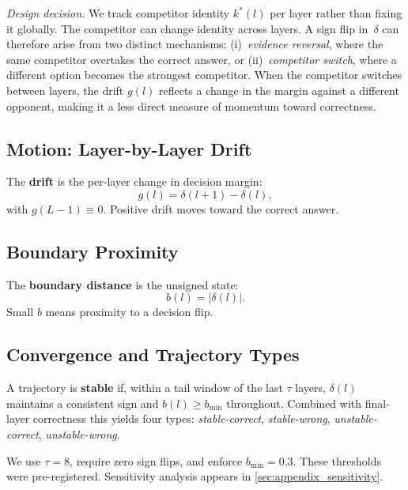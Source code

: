 \documentclass{article}
\begin{document}
\emph{Design decision.}  We track competitor identity $k^*(l)$ per layer rather than fixing it globally.  The competitor can change identity across layers.  A sign flip in~$\delta$ can therefore arise from two distinct mechanisms: (i)~\emph{evidence reversal}, where the same competitor overtakes the correct answer, or (ii)~\emph{competitor switch}, where a different option becomes the strongest competitor.  When the competitor switches between layers, the drift $g(l)$ reflects a change in the margin against a different opponent, making it a less direct measure of momentum toward correctness.

\subsection{Motion: Layer-by-Layer Drift}

The \textbf{drift} is the per-layer change in decision margin:
\begin{equation}
  g(l) = \delta(l{+}1) - \delta(l),
  \label{eq:drift}
\end{equation}
with $g(L{-}1) \equiv 0$.  Positive drift moves toward the correct answer.

\subsection{Boundary Proximity}

The \textbf{boundary distance} is the unsigned state:
\begin{equation}
  b(l) = |\delta(l)|.
  \label{eq:boundary}
\end{equation}
Small $b$ means proximity to a decision flip.

\subsection{Convergence and Trajectory Types}

A trajectory is \textbf{stable} if, within a tail window of the last $\tau$ layers, $\delta(l)$ maintains a consistent sign and $b(l) \geq b_{\min}$ throughout.  Combined with final-layer correctness this yields four types: \emph{stable-correct}, \emph{stable-wrong}, \emph{unstable-correct}, \emph{unstable-wrong}.

We use $\tau = 8$, require zero sign flips, and enforce $b_{\min} = 0.3$.  These thresholds were pre-registered.  Sensitivity analysis appears in \cref{sec:appendix_sensitivity}.
\end{document}
